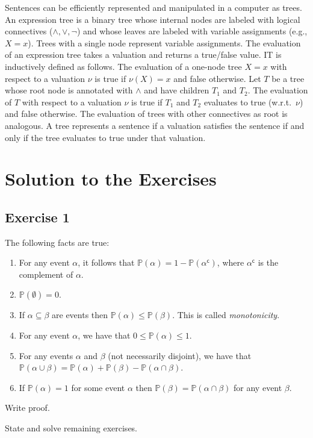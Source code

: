 \documentclass{amsart}
\newcommand{\pr}{\mathbb{P}}
\begin{document}
Sentences can be efficiently represented and manipulated in a computer
as trees. An expression tree is a binary tree whose internal nodes are
labeled with logical connectives ($\wedge, \vee, \neg$) and whose leaves
are labeled with variable assignments (e.g., $X=x$). Trees with a single
node represent variable assignments. The evaluation of an expression
tree takes a valuation and returns a true/false value. IT is inductively
defined as follows. The evaluation of a one-node tree $X=x$ with respect
to a valuation $\nu$ is true if $\nu(X)=x$ and false otherwise. Let $T$
be a tree whose root node is annotated with $\wedge$ and have children
$T_1$ and $T_2$. The evaluation of $T$ with respect to a valuation $\nu$
is true if $T_1$ and $T_2$ evaluates to true (w.r.t.~$\nu$) and false
otherwise. The evaluation of trees with other connectives as root is
analogous. A tree represents a sentence if a valuation satisfies the
sentence if and only if the tree evaluates to true under that valuation.

\section{Solution to the Exercises}

\subsection{Exercise 1} The following facts are true:
\begin{enumerate}
\item For any event $\alpha$, it follows that
  $\pr(\alpha)=1-\pr(\alpha^\mathsf{c})$, where $\alpha^\mathsf{c}$ is
  the complement of $\alpha$. 
\item $\pr(\emptyset)=0$.
\item If $\alpha \subseteq \beta$ are events then
  $\pr(\alpha) \leq \pr(\beta)$.  This is called \emph{monotonicity}.
\item For any event $\alpha$, we have that $0 \leq \mathbb{P}(\alpha) \leq 1$.
\item For any events $\alpha$ and $\beta$ (not necessarily disjoint), we have that $\pr(\alpha \cup \beta) = \pr(\alpha) + \pr(\beta) - \pr(\alpha \cap \beta)$.
\item If $\pr(\alpha)=1$ for some event $\alpha$ then $\pr(\beta)=\pr(\alpha \cap \beta)$ for any event $\beta$.
\end{enumerate}
Write proof.

State and solve remaining exercises.
\end{document}
